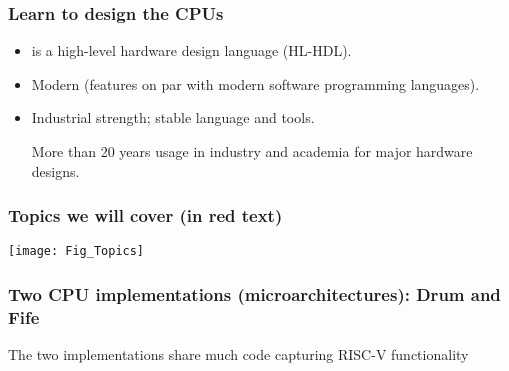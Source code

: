 \begin{frame}
\frametitle{Learn {\BSV} to design the CPUs}

\footnotesize

\begin{itemize}

 \item {\BSV} is a high-level hardware design language (HL-HDL).

 \item Modern (features on par with modern software programming languages).

 \item Industrial strength; stable language and tools.

       More than 20 years usage in industry and academia for major hardware designs.
\end{itemize}

\end{frame}


\begin{frame}
\frametitle{Topics we will cover (in red text)}

\footnotesize

\begin{center}
\texttt{[image: Fig\_Topics]}
\end{center}

\end{frame}


\begin{frame}
\frametitle{Two CPU implementations (microarchitectures): Drum and Fife}

\footnotesize

\begin{center}
\end{center}

The two implementations share much code capturing RISC-V functionality

\end{frame}


